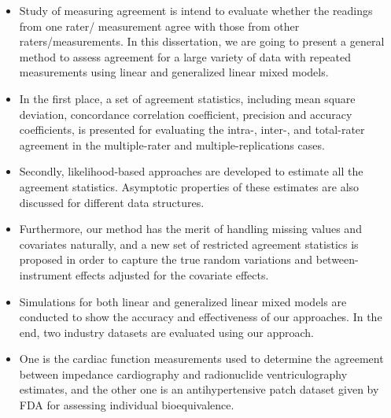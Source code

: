 \documentclass[12pt, a4paper]{report}
\theoremstyle{plain}
\theoremstyle{definition}
\theoremstyle{remark}
\begin{document}
	\begin{itemize}
		\item Study of measuring agreement is intend to evaluate whether the readings from one rater/ measurement 
		agree with those from other raters/measurements. 
		In this dissertation, we are going to present a general method to assess agreement for a large 
		variety of data with repeated measurements using linear and generalized linear mixed models. 
		\item In the first place, a set of agreement statistics, including mean square deviation, concordance 
		correlation coefficient, precision and accuracy coefficients, is presented for evaluating the 
		intra-, inter-, and total-rater agreement in the multiple-rater and multiple-replications cases. 
		\item Secondly, likelihood-based approaches are developed to estimate all the agreement statistics. 
		Asymptotic properties of these estimates are also discussed for different data structures. 
		\item Furthermore, our method has the merit of handling missing values and covariates naturally, 
		and a new set of restricted agreement statistics is proposed in order to capture the true random 
		variations and between-instrument effects adjusted for the covariate effects. 
		
		\item Simulations for both linear and generalized linear mixed models are conducted to show the accuracy and effectiveness 
		of our approaches. In the end, two industry datasets are evaluated using our approach. 
		\item One is the cardiac function measurements used to determine the agreement between impedance cardiography and radionuclide 
		ventriculography estimates, and the other one is an antihypertensive patch dataset given by FDA for assessing 
		individual bioequivalence.
	\end{itemize}
	
\end{document}

